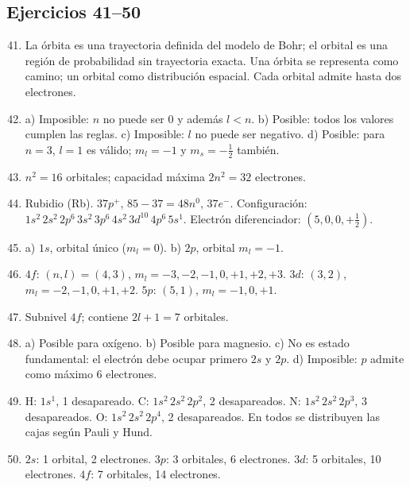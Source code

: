 \documentclass[12pt, letterpaper]{article}
\begin{document}
\subsection*{Ejercicios 41--50}
\begin{enumerate}[leftmargin=*, label=\textbf{\arabic*.}]
  \setcounter{enumi}{40}
  \item La órbita es una trayectoria definida del modelo de Bohr; el orbital es una región de probabilidad sin trayectoria exacta. Una órbita se representa como camino; un orbital como distribución espacial. Cada orbital admite hasta dos electrones.
  \item a) Imposible: $n$ no puede ser 0 y además $l<n$. b) Posible: todos los valores cumplen las reglas. c) Imposible: $l$ no puede ser negativo. d) Posible: para $n=3$, $l=1$ es válido; $m_l=-1$ y $m_s=-\tfrac12$ también.
  \item $n^2=16$ orbitales; capacidad máxima $2n^2=32$ electrones.
  \item Rubidio (Rb). $37p^+$, $85-37=48n^0$, $37e^-$. Configuración: $1s^2\,2s^2\,2p^6\,3s^2\,3p^6\,4s^2\,3d^{10}\,4p^6\,5s^1$. Electrón diferenciador: $(5,0,0,+\tfrac12)$.
  \item a) $1s$, orbital único ($m_l=0$). b) $2p$, orbital $m_l=-1$.
  \item $4f$: $(n,l)=(4,3)$, $m_l=-3,-2,-1,0,+1,+2,+3$. $3d$: $(3,2)$, $m_l=-2,-1,0,+1,+2$. $5p$: $(5,1)$, $m_l=-1,0,+1$.
  \item Subnivel $4f$; contiene $2l+1=7$ orbitales.
  \item a) Posible para oxígeno. b) Posible para magnesio. c) No es estado fundamental: el electrón debe ocupar primero $2s$ y $2p$. d) Imposible: $p$ admite como máximo 6 electrones.
  \item H: $1s^1$, 1 desapareado. C: $1s^2\,2s^2\,2p^2$, 2 desapareados. N: $1s^2\,2s^2\,2p^3$, 3 desapareados. O: $1s^2\,2s^2\,2p^4$, 2 desapareados. En todos se distribuyen las cajas según Pauli y Hund.
  \item $2s$: 1 orbital, 2 electrones. $3p$: 3 orbitales, 6 electrones. $3d$: 5 orbitales, 10 electrones. $4f$: 7 orbitales, 14 electrones.
\end{enumerate}
\end{document}
